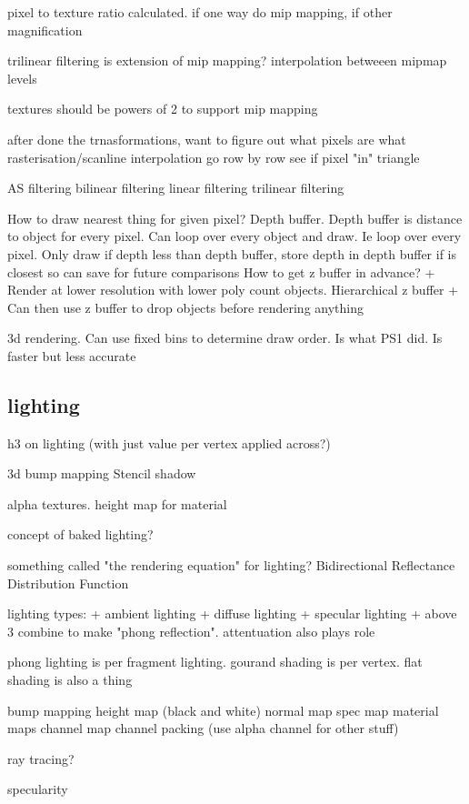 pixel to texture ratio calculated. if one way do mip mapping, if other magnification

trilinear filtering is extension of mip mapping? interpolation betweeen mipmap levels

textures should be powers of 2 to support mip mapping

after done the trnasformations, want to figure out what pixels are what
rasterisation/scanline interpolation
go row by row
see if pixel "in" triangle

AS filtering
bilinear filtering
linear filtering
trilinear filtering

How to draw nearest thing for given pixel? Depth buffer. Depth buffer is distance to object for every pixel.
Can loop over every object and draw. Ie loop over every pixel. Only draw if depth less than depth buffer, store depth in depth buffer if is closest so can save for future comparisons
How to get z buffer in advance?
+ Render at lower resolution with lower poly count objects. Hierarchical z buffer
+ Can then use z buffer to drop objects before rendering anything

3d rendering. Can use fixed bins to determine draw order. Is what PS1 did. Is faster but less accurate

\subsection{lighting}

h3 on lighting (with just value per vertex applied across?)

3d bump mapping
Stencil shadow

alpha textures. height map for material

concept of baked lighting?

something called "the rendering equation" for lighting?
Bidirectional Reflectance Distribution Function

lighting types:
+ ambient lighting
+ diffuse lighting
+ specular lighting
+ above 3 combine to make "phong reflection". attentuation also plays role

phong lighting is per fragment lighting. gourand shading is per vertex. flat shading is also a thing


bump mapping
height map (black and white)
normal map
spec map
material maps
channel map
channel packing (use alpha channel for other stuff)

ray tracing?

specularity

